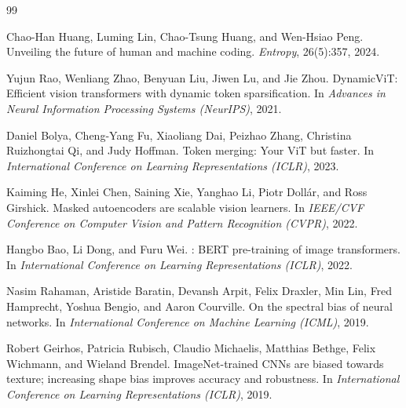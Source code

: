 \documentclass[10pt,twocolumn]{article}
\begin{document}
\begin{thebibliography}{99}

Chao-Han Huang, Luming Lin, Chao-Tsung Huang, and Wen-Hsiao Peng.
\newblock Unveiling the future of human and machine coding.
\newblock \emph{Entropy}, 26(5):357, 2024.

Yujun Rao, Wenliang Zhao, Benyuan Liu, Jiwen Lu, and Jie Zhou.
\newblock Dynamic{V}i{T}: Efficient vision transformers with dynamic token sparsification.
\newblock In \emph{Advances in Neural Information Processing Systems (NeurIPS)}, 2021.

Daniel Bolya, Cheng-Yang Fu, Xiaoliang Dai, Peizhao Zhang, Christina Ruizhongtai Qi, and Judy Hoffman.
\newblock Token merging: Your {V}i{T} but faster.
\newblock In \emph{International Conference on Learning Representations (ICLR)}, 2023.

Kaiming He, Xinlei Chen, Saining Xie, Yanghao Li, Piotr Doll\'ar, and Ross Girshick.
\newblock Masked autoencoders are scalable vision learners.
\newblock In \emph{IEEE/CVF Conference on Computer Vision and Pattern Recognition (CVPR)}, 2022.

Hangbo Bao, Li Dong, and Furu Wei.
: {BERT} pre-training of image transformers.
\newblock In \emph{International Conference on Learning Representations (ICLR)}, 2022.

Nasim Rahaman, Aristide Baratin, Devansh Arpit, Felix Draxler, Min Lin, Fred Hamprecht, Yoshua Bengio, and Aaron Courville.
\newblock On the spectral bias of neural networks.
\newblock In \emph{International Conference on Machine Learning (ICML)}, 2019.

Robert Geirhos, Patricia Rubisch, Claudio Michaelis, Matthias Bethge, Felix Wichmann, and Wieland Brendel.
\newblock ImageNet-trained {CNN}s are biased towards texture; increasing shape bias improves accuracy and robustness.
\newblock In \emph{International Conference on Learning Representations (ICLR)}, 2019.

\end{thebibliography}
\end{document}
